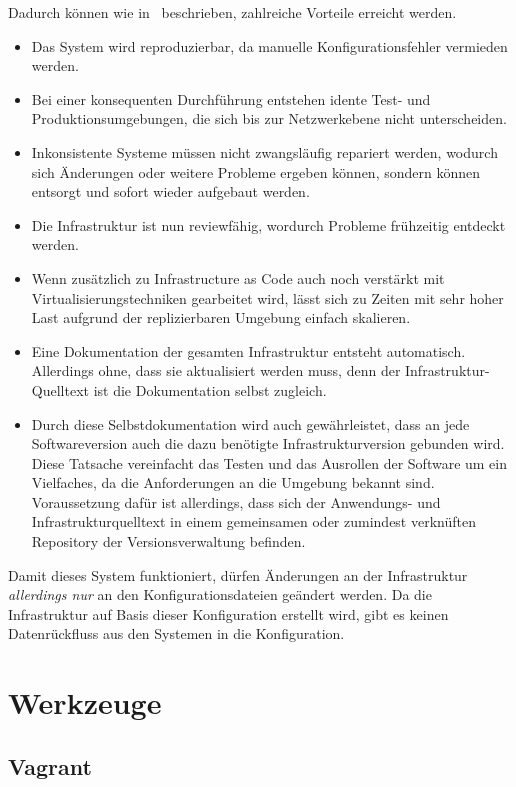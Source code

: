 Dadurch können wie in~\autocite[64\psqq]{Wolff201604} beschrieben, zahlreiche Vorteile erreicht werden.
\begin{itemize}
    \item Das System wird reproduzierbar, da manuelle Konfigurationsfehler vermieden werden.
    \item Bei einer konsequenten Durchführung entstehen idente Test- und Produktionsumgebungen, die sich bis zur Netzwerkebene nicht unterscheiden.
    \item Inkonsistente Systeme müssen nicht zwangsläufig repariert werden, wodurch sich Änderungen oder weitere Probleme ergeben können, sondern können entsorgt und sofort wieder aufgebaut werden.
    \item Die Infrastruktur ist nun reviewfähig, wordurch Probleme frühzeitig entdeckt werden.
    \item Wenn zusätzlich zu Infrastructure as Code auch noch verstärkt mit Virtualisierungstechniken gearbeitet wird, lässt sich zu Zeiten mit sehr hoher Last aufgrund der replizierbaren Umgebung einfach skalieren.
    \item Eine Dokumentation der gesamten Infrastruktur entsteht automatisch. Allerdings ohne, dass sie aktualisiert werden muss, denn der Infrastruktur-Quelltext ist die Dokumentation selbst zugleich.
    \item Durch diese Selbstdokumentation wird auch gewährleistet, dass an jede Softwareversion auch die dazu benötigte Infrastrukturversion gebunden wird. Diese Tatsache vereinfacht das Testen und das Ausrollen der Software um ein Vielfaches, da die Anforderungen an die Umgebung bekannt sind. Voraussetzung dafür ist allerdings, dass sich der Anwendungs- und Infrastrukturquelltext in einem gemeinsamen oder zumindest verknüften Repository der Versionsverwaltung befinden.
\end{itemize}
Damit dieses System funktioniert, dürfen Änderungen an der Infrastruktur \emph{allerdings nur} an den Konfigurationsdateien geändert werden. Da die Infrastruktur auf Basis dieser Konfiguration erstellt wird, gibt es keinen Datenrückfluss aus den Systemen in die Konfiguration.


\section{Werkzeuge}
\label{sec:konfigurationswerkzeuge}
\subsection{Vagrant}
\label{sub:vagrant}


